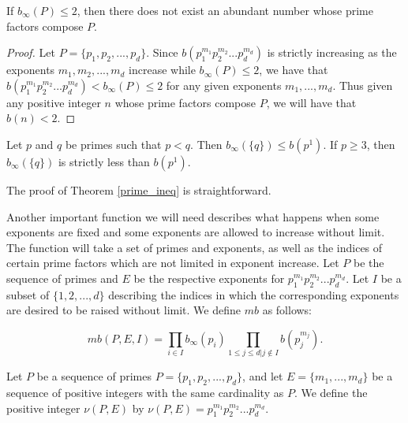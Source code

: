 \documentclass[../paper.tex]{article}
\begin{document}
\begin{theorem} \label{b_inf_n!}
If $b_{\infty}(P) \leq 2$, then there does not exist an abundant
number whose prime factors compose $P$.
\end{theorem}

\begin{proof}
Let $P = \{p_1, p_2, ..., p_d\}$.
Since $b(p_1^{m_1} p_2^{m_2} ... p_d^{m_d})$ is strictly increasing as the
exponents $m_1, m_2, ..., m_d$ increase while $b_{\infty}(P) \leq
2$, we have that $b(p_1^{m_1} p_2^{m_2} ... p_d^{m_d}) < 
b_{\infty}(P) \leq 2$ for any given exponents $m_1, ..., m_d$. 
Thus given any positive integer $n$ whose prime factors compose
$P$, we will have that $b(n) < 2$.
\end{proof}

\begin{theorem} \label{prime_ineq}
Let $p$ and $q$ be primes such that $p < q$. Then $b_\infty(\{q\})
\leq b(p^1)$. If $p \geq 3$, then $b_{\infty}(\{q\})$ is strictly
less than $b(p^1)$.
\end{theorem}

The proof of Theorem \ref{prime_ineq} is straightforward.

Another important function we will need describes what happens 
when some exponents are fixed and some exponents are allowed to
increase without limit. 
The function will take a set of primes and exponents,
as well as the indices of certain prime factors which are not
limited in exponent increase. Let $P$ be the sequence of primes 
and $E$ be the respective exponents for 
$p_1^{m_1} p_2^{m_2} ... p_d^{m_d}$. Let $I$ be a subset of
$\{1, 2, ..., d\}$ describing the indices in which the corresponding
exponents are desired to be raised without limit. We define $mb$ as 
follows:

\begin{equation}\label{mb_def}
  mb(P,E,I) = \prod_{i \in I} b_{\infty}(p_i) 
  \prod_{1 \leq j \leq d | j \notin I} b(p_j^{m_j}).
\end{equation}


Let $P$ be a sequence of primes $P = \{p_1, p_2, ..., p_d\}$,
and let $E = \{m_1, ..., m_d\}$ be a sequence of positive integers
with the same cardinality as $P$. We define the positive integer 
$\nu(P,E)$ by $\nu(P,E) = p_1^{m_1} p_2^{m_2} ... p_d^{m_d}$. 
\end{document}
